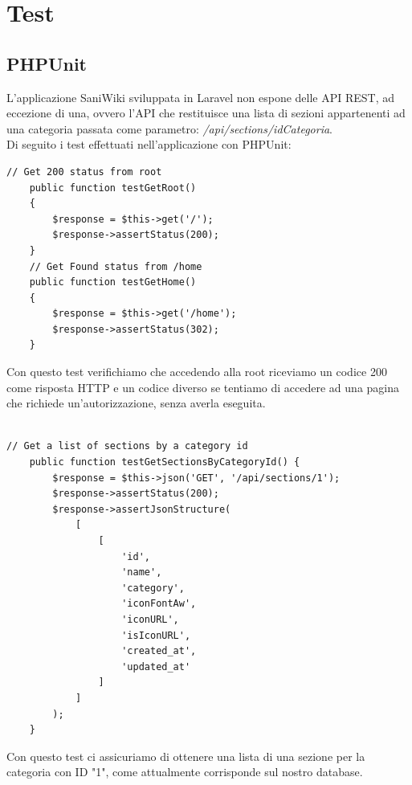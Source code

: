 \documentclass[twoside]{supsistudent}
\begin{document}
\chapter{Test}

\section{PHPUnit}
L'applicazione SaniWiki sviluppata in Laravel non espone delle API REST, ad eccezione di una, ovvero l'API che restituisce una lista di sezioni appartenenti ad una categoria passata come parametro: \textit{/api/sections/idCategoria}.\\
Di seguito i test effettuati nell'applicazione con PHPUnit:
\begin{verbatim}
// Get 200 status from root
    public function testGetRoot()
    {
        $response = $this->get('/');
        $response->assertStatus(200);
    }
    // Get Found status from /home
    public function testGetHome()
    {
        $response = $this->get('/home');
        $response->assertStatus(302);
    }
\end{verbatim}
Con questo test verifichiamo che accedendo alla root riceviamo un codice 200 come risposta HTTP e un codice diverso se tentiamo di accedere ad una pagina che richiede un'autorizzazione, senza averla eseguita.
\\\\
\begin{verbatim}
// Get a list of sections by a category id
    public function testGetSectionsByCategoryId() {
        $response = $this->json('GET', '/api/sections/1');
        $response->assertStatus(200);
        $response->assertJsonStructure(
            [
                [
                    'id',
                    'name',
                    'category',
                    'iconFontAw',
                    'iconURL',
                    'isIconURL',
                    'created_at',
                    'updated_at'
                ]
            ]
        );
    }
\end{verbatim}
Con questo test ci assicuriamo di ottenere una lista di una sezione per la categoria con ID "1", come attualmente corrisponde sul nostro database.
\end{document}
